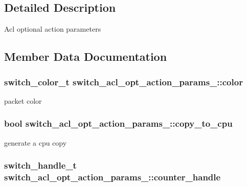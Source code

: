 \subsection{Detailed Description}
Acl optional action parameters 

\subsection{Member Data Documentation}
\hypertarget{structswitch__acl__opt__action__params___a3bab0475bec6809fc0c1ca55af50e552}{
\subsubsection[{color}]{\setlength{\rightskip}{0pt plus 5cm}switch\+\_\+color\+\_\+t switch\+\_\+acl\+\_\+opt\+\_\+action\+\_\+params\+\_\+\+::color}}\label{structswitch__acl__opt__action__params___a3bab0475bec6809fc0c1ca55af50e552}
packet color \hypertarget{structswitch__acl__opt__action__params___ab257b14cc3d1e2e0c6a907dafd194274}{
\subsubsection[{copy\+\_\+to\+\_\+cpu}]{\setlength{\rightskip}{0pt plus 5cm}bool switch\+\_\+acl\+\_\+opt\+\_\+action\+\_\+params\+\_\+\+::copy\+\_\+to\+\_\+cpu}}\label{structswitch__acl__opt__action__params___ab257b14cc3d1e2e0c6a907dafd194274}
generate a cpu copy \hypertarget{structswitch__acl__opt__action__params___a073717f19037971ea71f8edbf059a1a8}{
\subsubsection[{counter\+\_\+handle}]{\setlength{\rightskip}{0pt plus 5cm}switch\+\_\+handle\+\_\+t switch\+\_\+acl\+\_\+opt\+\_\+action\+\_\+params\+\_\+\+::counter\+\_\+handle}}\label{structswitch__acl__opt__action__params___a073717f19037971ea71f8edbf059a1a8}
